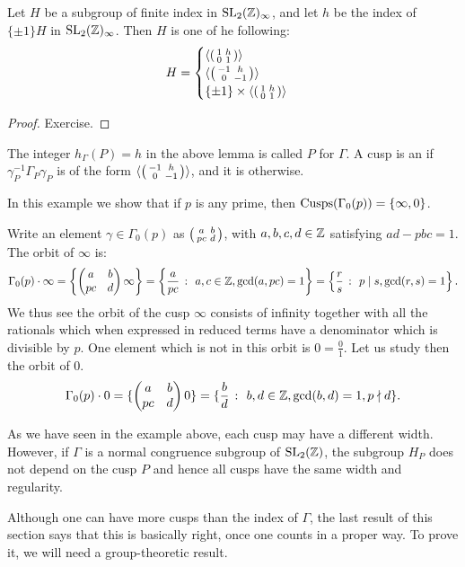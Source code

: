 \begin{lemma}
  Let $H$ be a subgroup of finite index in $\operatorname{SL}_2(\mathbb{Z})_\infty$, and let $h$ be the index of $\{\pm 1\}H$ in $\operatorname{SL}_2(\mathbb{Z})_\infty$. Then $H$ is one of he following:
\[
H = \begin{cases}
\langle \left(\begin{smallmatrix}1&h\\0&1\end{smallmatrix}\right)\rangle&\\
\langle \left(\begin{smallmatrix}-1&h\\0&-1\end{smallmatrix}\right)\rangle&\\
\{\pm 1\}\times \langle \left(\begin{smallmatrix}1&h\\0&1\end{smallmatrix}\right)\rangle&
\end{cases}
\]
\end{lemma}
\begin{proof}
  Exercise.
\end{proof}
\begin{definition}
The integer $h_\Gamma(P)=h$ in the above lemma is called  $P$ for $\Gamma$. A cusp is an  if $\gamma_P^{-1}\Gamma_P\gamma_P$ is of the form $\langle \left(\begin{smallmatrix}-1&h\\0&-1\end{smallmatrix}\right)\rangle$, and it is  otherwise.
\end{definition}

\begin{example}
  In this example we show that if $p$ is any prime, then $\operatorname{Cusps}(\Gamma_0(p)) = \{ \infty, 0\}$.

Write an element $\gamma\in\Gamma_0(p)$ as $\left(\begin{smallmatrix}a&b\\pc&d\end{smallmatrix}\right)$, with $a,b,c,d\in\mathbb{Z}$ satisfying $ad-pbc =1$. The orbit of $\infty$ is:
\[
\Gamma_0(p)\cdot \infty = \left\{\left(\begin{matrix}a&b\\pc&d\end{matrix}\right)\infty\right\} = \left\{\frac{a}{pc}~\colon~ a,c\in\mathbb{Z},\gcd(a,pc) = 1\right\} = \left\{ \frac{r}{s}~\colon~ p\mid s, \gcd(r,s)=1\right\}.
\]
We thus see the orbit of the cusp $\infty$ consists of infinity together with all the rationals which when expressed in reduced terms have a denominator which is divisible by $p$. One element which is not in this orbit is $0=\frac{0}{1}$. Let us study then the orbit of $0$.
\[
\Gamma_0(p) \cdot 0 = \{\left(\begin{matrix}a&b\\pc&d\end{matrix}\right) 0\} = \{\frac{b}{d}~\colon~ b,d\in\mathbb{Z}, \gcd(b,d)=1, p\nmid d\}.
\]
\end{example}
As we have seen in the example above, each cusp may have a different width. However, if $\Gamma$ is a normal congruence subgroup of $\operatorname{SL}_2(\mathbb{Z})$, the subgroup $H_P$ does not depend on the cusp $P$ and hence all cusps have the same width and regularity.

Although one can have more cusps than the index of $\Gamma$, the last result of this section says that this is basically right, once one counts in a proper way. To prove it, we will need a group-theoretic result.

